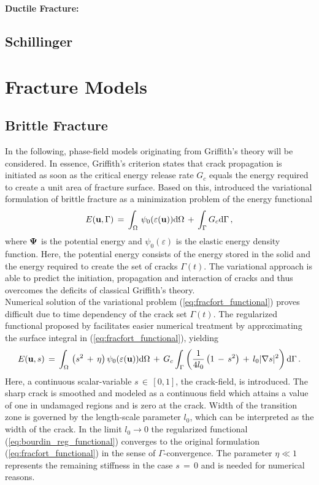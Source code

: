 {\bf Ductile Fracture:}

\section{Schillinger}

\chapter{Fracture Models}
\section{Brittle Fracture}
In the following, phase-field models originating from Griffith's theory will be considered. In essence, Griffith's criterion states that crack propagation is initiated as soon as the critical energy release rate $G_{c}$ equals the energy required to create a unit area of fracture surface. Based on this, \cite{fran1998revisiting} introduced the variational formulation of brittle fracture as a minimization problem of the energy functional
\begin{equation}
\label{eq:fracfort_functional}
E({\bf u}, \Gamma)\,=\, \int_{\Omega}\,\psi_{0}(\varepsilon({\bf u})) \textrm{d}\Omega\,+\,\int_{\Gamma} G_{c}  \textrm{d}\Gamma\,,
\end{equation}
where $\bf \Psi$ is the potential energy and $\psi_{0}(\varepsilon)$ is the elastic energy density function. Here, the potential energy consists of the energy stored in the solid and the energy required to create the set of cracks $\Gamma(t)$. The variational approach is able to predict the initiation, propagation and interaction of cracks and thus overcomes the deficits of classical Griffith's theory. \\
Numerical solution of the variational problem (\ref{eq:fracfort_functional}) proves difficult due to time dependency of the crack set $\Gamma (t)$. The regularized functional proposed by \cite{bour2008} facilitates easier numerical treatment by approximating the surface integral in (\ref{eq:fracfort_functional}), yielding
\begin{equation}
\label{eq:bourdin_reg_functional}
E({\bf u}, s)\,=\, \int_{\Omega}\,\left(s^2\,+\,\eta\right)\psi_{0}(\varepsilon({\bf u})) \textrm{d}\Omega\,+\,G_{c}\int_{\Gamma} \left( \frac{1}{4 l_{0}} \left(1\,-\,s^2\right) \,+\, l_{0} |\nabla s|^2\right) \textrm{d}\Gamma\,.
\end{equation}
Here, a continuous scalar-variable $s\,\in\,[0,1]$, the crack-field, is introduced. The sharp crack is smoothed and modeled as a continuous field which attains a value of one in undamaged regions and is zero at the crack. Width of the transition zone is governed by the length-scale parameter $l_{0}$, which can be interpreted as the width of the crack. In the limit $l_{0} \rightarrow 0$ the regularized functional (\ref{eq:bourdin_reg_functional}) converges to the original formulation (\ref{eq:fracfort_functional}) in the sense of $\Gamma$-convergence. The parameter $\eta \ll 1$ represents the remaining stiffness in the case $s\,=\,0$ and is needed for numerical reasons.\\

